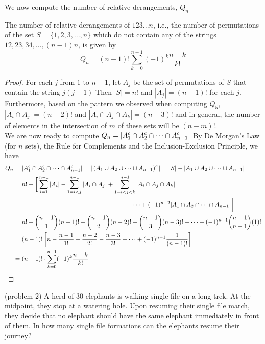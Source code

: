 \documentclass[handout]{ximera}
\begin{document}
We now compute the number of relative derangements, $Q_n$

\begin{theorem}
The number of relative derangements of $123...n$, i.e., the number of permutations of the set $S = \{1, 2, 3, ..., n\}$ which do not contain any of the strings $12, 23, 34, ..., (n-1)n$, is given by
\[
Q_n = (n-1)! \sum_{k = 0}^{n-1} (-1)^k \frac{n-k}{k!}
\]
\end{theorem}



\begin{proof}
For each $j$ from $1$ to $n-1$, let $A_j$ be the set of permutations of $S$ that contain the string $j(j+1)$ 
Then $|S| = n!$ and $|A_j| = (n-1)!$ for each $j$. Furthermore, based on the pattern we observed when computing $Q_5$,  $|A_i \cap A_j| = (n-2)!$ and $|A_i \cap A_j \cap A_k| = (n-3)!$ and in general, 
the number of elements in the intersection of $m$ of these sets will be $(n-m)!$.\\
We are now ready to compute $\displaystyle Q_n = |A_1^c \cap A_2^c \cap \cdots \cap A_{n-1}^c|$
By De Morgan's Law (for $n$ sets), the Rule for Complements and the Inclusion-Exclusion Principle, we have
\begin{align*}
Q_n &= |A_1^c \cap A_2^c \cap \cdots \cap A_{n-1}^c| = |\left(A_1 \cup A_2 \cup \cdots \cup A_{n-1}\right)^c|
   = |S| - |A_1 \cup A_2 \cup \cdots \cup A_{n-1}|\\
   &= n! - \bigg[\sum_{i =1}^{n-1} |A_i| - \sum_{1 =i<j}^{n-1} |A_i\cap A_j|+ 
   \sum_{1 =i<j< k}^{n-1} |A_i\cap A_j \cap A_k| \\
   &\hspace{2.5 in} - \cdots + (-1)^{n-2} |A_1 \cap A_2 \cap \cdots \cap A_{n-1}|\bigg]\\
   &= n! - \binom{n-1}{1}(n-1)! + \binom{n-1}{2}(n-2)! - \binom{n-1}{3}(n-3)! + \cdots + (-1)^{n-1} \binom{n-1}{n-1}(1)!\\
   &= (n-1)!\left[n -\frac{n-1}{1!} + \frac{n-2}{2!} - \frac{n-3}{3!} + \cdots + (-1)^{n-1} \frac{1}{(n-1)!}\right]\\
   &= (n-1)! \cdot \sum_{k=0}^{n-1} (-1)^k \frac{n-k}{k!}
\end{align*}


\end{proof}

\begin{problem}(problem 2) A herd of 30 elephants is walking single file on a long trek.  
At the midpoint, they stop at a watering hole. Upon resuming their single file march, they decide that 
no elephant should have the same elephant immediately in front of them.  
In how many single file formations can the elephants resume their journey?\\
\begin{multipleChoice}
\\
\\
\\
\end{multipleChoice}
\end{problem}
\end{document}
